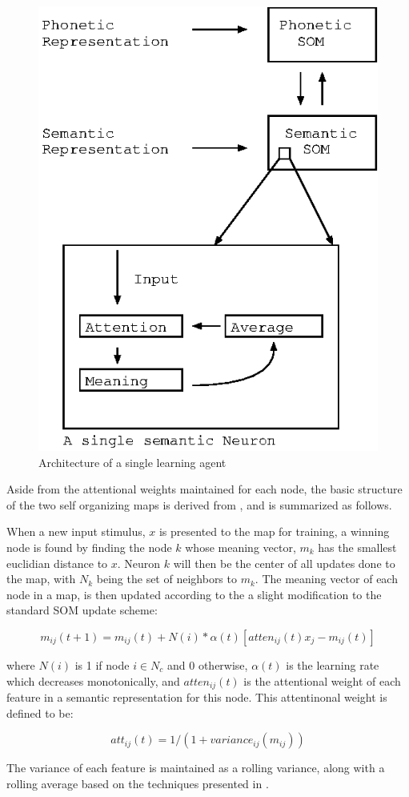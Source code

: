 \documentclass[a4paper,11pt]{article}
\begin{document}
\begin{figure} \center \includegraphics[width=.49\textwidth]{arch.eps}
\caption{Architecture of a single learning agent} \label{fig:arch} \end{figure}

Aside from the attentional weights maintained for each node, the basic
structure of the two self organizing maps is derived from
\cite{LiDevLex,MiikDisLex}, and is summarized as follows.

When a new input stimulus, $x$ is presented to the map for training, a winning
node is found by finding the node $k$ whose meaning vector, $m_k$ has the
smallest euclidian distance to $x$.  Neuron $k$ will then be the center of all
updates done to the map, with $N_k$ being the set of neighbors to $m_k$.  The
meaning vector of each node in a map, is then updated according to the a
slight modification to the standard SOM update scheme:

{\small \begin{equation}\label{eq:meaning_weight}
m_{ij}(t+1) = m_{ij}(t) + N(i)*\alpha(t)[atten_{ij}(t)x_j - m_{ij}(t)]
\end{equation} }

where $N(i)$ is 1 if node $i \in N_c$ and 0 otherwise, $\alpha(t)$ is the
learning rate which decreases monotonically, and $atten_{ij}(t)$ is the
attentional weight of each feature in a semantic representation for this node.
This attentinonal weight is defined to be:

\begin{equation}\label{eq:atten}
att_{ij}(t) = 1 / (1 + variance_{ij}(m_{ij}))
\end{equation}

The variance of each feature is maintained as a rolling variance, along with a
rolling average based on the techniques presented in
\cite{mints93rollingvariance}.
\end{document}
